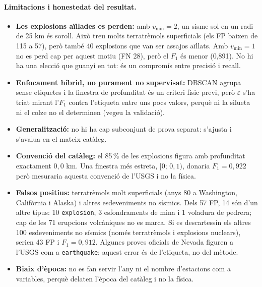 \documentclass[a4paper,11pt]{article}
\begin{document}
\paragraph{Limitacions i honestedat del resultat.}
\begin{itemize}
  \item \textbf{Les explosions aïllades es perden:} amb $v_{\min}=2$, un sisme sol en un radi de 25 km és soroll. Això treu molts terratrèmols superficials (els FP baixen de 115 a 57), però també 40 explosions que van ser assajos aïllats. Amb $v_{\min}=1$ no es perd cap per aquest motiu (FN 28), però el $F_1$ és menor (0,891). No hi ha una elecció que guanyi en tot: és un compromís entre precisió i recall.
  \item \textbf{Enfocament híbrid, no purament no supervisat:} DBSCAN agrupa sense etiquetes i la finestra de profunditat és un
        criteri físic previ, però $\varepsilon$ s'ha triat mirant l'$F_1$ contra l'etiqueta entre uns pocs valors, perquè ni la
        silueta ni el colze no el determinen (vegeu la validació).
  \item \textbf{Generalització:} no hi ha cap subconjunt de prova separat: s'ajusta i s'avalua en el mateix catàleg.
  \item \textbf{Convenció del catàleg:} el 85\,\% de les explosions figura amb profunditat exactament $0{,}0$ km. Una finestra
        més estreta, $[0;\,0{,}1)$, donaria $F_1=0{,}922$ però mesuraria aquesta convenció de l'USGS i no la física.
  \item \textbf{Falsos positius:} terratrèmols molt superficials (anys 80 a Washington, Califòrnia i Alaska) i altres
        esdeveniments no sísmics. Dels 57 FP, 14 són d'un altre tipus: 10 \texttt{explosion}, 3 esfondraments de mina i 1 voladura de pedrera; cap de les 71 erupcions volcàniques no es marca. Si es descartessin els altres 100 esdeveniments no sísmics (només terratrèmols i explosions nuclears), serien 43 FP i $F_1=0{,}912$. Algunes proves oficials de Nevada figuren a l'USGS com a \texttt{earthquake}; aquest error és de
        l'etiqueta, no del mètode.
  \item \textbf{Biaix d'època:} no es fan servir l'any ni el nombre d'estacions com a variables, perquè delaten l'època del
        catàleg i no la física.
\end{itemize}
\end{document}
